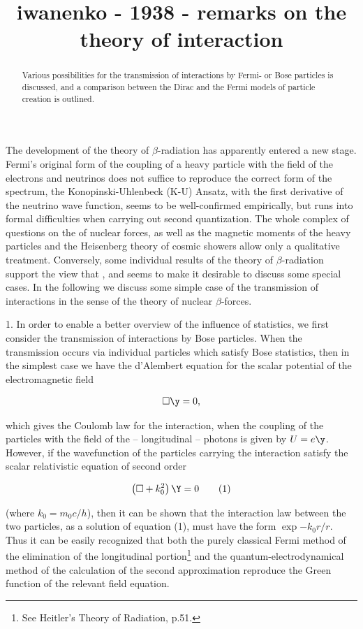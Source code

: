 \documentclass{article}
\title{iwanenko - 1938 - remarks on the theory of interaction}
\newcommand{\nequ}[2]{
\begin{align*}
#1
\tag{#2}
\end{align*}
}
\newcommand{\uequ}[1]{
\begin{align*}
#1
\end{align*}
}
\begin{document}
\begin{abstract}
Various possibilities for the transmission of interactions by Fermi- or Bose particles is discussed, and a comparison between the Dirac and the Fermi models of particle creation is outlined.
\end{abstract}

The development of the theory of $\beta$-radiation has apparently entered a new stage. Fermi's original form of the coupling of a heavy particle with the field of the electrons and neutrinos does not suffice to reproduce the correct form of the spectrum, the Konopinski-Uhlenbeck (K-U) Ansatz, with the first derivative of the neutrino wave function, seems to be well-confirmed empirically, but runs into formal difficulties when carrying out second quantization. The whole complex of questions on the  of nuclear forces, as well as the magnetic moments of the heavy particles and the Heisenberg theory of cosmic showers allow only a qualitative treatment. Conversely, some individual results of the  theory of $\beta$-radiation support the view that , and seems to make it desirable to discuss some special cases. In the following we discuss some simple case of the transmission of interactions in the sense of the theory of nuclear $\beta$-forces.

1. In order to enable a better overview of the influence of statistics, we first consider the transmission of interactions by Bose particles. When the transmission occurs via individual particles which satisfy Bose statistics, then in the simplest case we have the d'Alembert equation for the scalar potential of the electromagnetic field
\uequ{
\square\y = 0,
}
which gives the Coulomb law for the interaction, when the coupling of the particles with the field of the -- longitudinal -- photons is given by $U=e\y$. However, if the wavefunction of the particles carrying the interaction satisfy the scalar relativistic equation of second order
\nequ{
\left(\square + k_0^2\right)\Y = 0
}{1}
(where $k_0=m_0 c/h$), then it can be shown that the interaction law between the two particles, as a solution of equation (1), must have the form $\exp{-k_0 r}/r$. Thus it can be easily recognized that both the purely classical Fermi method of the elimination of the longitudinal portion\footnote{See Heitler's Theory of Radiation, p.51.} and the quantum-electrodynamical method of the calculation of the second approximation reproduce the Green function of the relevant field equation.
\end{document}
